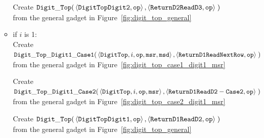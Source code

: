 \begin{itemize}
\begin{itemize}
        Create
        $\begin{aligned}[t]
            {\tt Digit\_Top}(& \left \langle {\tt DigitTopDigit2}, {\tt op} \right\rangle,
                    \left \langle {\tt ReturnD2ReadD3}, {\tt op} \right\rangle \;)
        \end{aligned}$ \\ from the general gadget in Figure~\ref{fig:digit_top_general}
        \vspace{.5cm}

        \item if $i$ is 1: \\
        Create
        $\begin{aligned}[t]
            {\tt Digit\_Top\_Digit1\_Case1}(& \left \langle {\tt DigitTop}, i, {\tt op}, {\tt msr}, {\tt msd} \right\rangle,
                               \left \langle {\tt ReturnD1ReadNextRow},  {\tt op} \right\rangle \;)
        \end{aligned}$ \\ from the general gadget in Figure~\ref{fig:digit_top_case1_digit1_msr}
        \vspace{.5cm}

        Create
        $\begin{aligned}[t]
            {\tt Digit\_Top\_Digit1\_Case2}(& \left \langle {\tt DigitTop}, i, {\tt op}, {\tt msr} \right\rangle,
                               \left \langle {\tt ReturnD1ReadD2-Case2}, {\tt op}  \right\rangle \;)
        \end{aligned}$ \\ from the general gadget in Figure~\ref{fig:digit_top_case2_digit1_msr}
        \vspace{0.5cm}

        Create
        $\begin{aligned}[t]
            {\tt Digit\_Top}(& \left \langle {\tt DigitTopDigit1}, {\tt op} \right\rangle,
                    \left \langle {\tt ReturnD1ReadD2}, {\tt op} \right\rangle \;)
        \end{aligned}$ \\ from the general gadget in Figure~\ref{fig:digit_top_general}
        \vspace{.5cm}


    \end{itemize}


\end{itemize}
